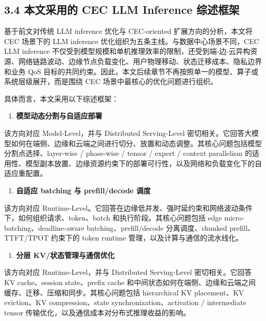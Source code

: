 \documentclass[a4paper,10pt]{ctexart}
\begin{document}
\subsection*{3.4 本文采用的 CEC LLM Inference 综述框架}



基于前文对传统 LLM inference 优化与 CEC-oriented 扩展方向的分析，本文将 CEC 场景下的 LLM inference 优化组织为五条主线。与数据中心场景不同，CEC LLM inference 不仅受到模型规模和单机推理效率的限制，还受到端-边-云异构资源、网络链路波动、边缘节点负载变化、用户物理移动、状态迁移成本、隐私边界和业务 QoS 目标的共同约束。因此，本文后续章节不再按照单一的模型、算子或系统层级展开，而是围绕 CEC 场景中最核心的优化问题进行组织。




具体而言，本文采用以下综述框架：


\begin{enumerate}
\item \textbf{模型动态分割与自适应部署}

\end{enumerate}
该方向对应 Model-Level，并与 Distributed Serving-Level 密切相关。它回答大模型如何在端侧、边缘和云端之间进行切分、放置和动态调整。其核心问题包括模型分割点选择、layer-wise / phase-wise / tensor / expert / context parallelism 的适用性、模型副本放置、边缘资源约束下的部署可行性，以及网络和负载变化下的自适应重配置。


\begin{enumerate}
\item \textbf{自适应 batching 与 prefill/decode 调度}

\end{enumerate}
该方向对应 Runtime-Level。它回答在边缘低并发、强时延约束和网络波动条件下，如何组织请求、token、batch 和执行阶段。其核心问题包括 edge micro-batching、deadline-aware batching、prefill/decode 分离调度、chunked prefill、TTFT/TPOT 约束下的 token runtime 管理，以及计算与通信的流水线化。


\begin{enumerate}
\item \textbf{分层 KV/状态管理与通信优化}

\end{enumerate}
该方向对应 Runtime-Level，并与 Distributed Serving-Level 密切相关。它回答 KV cache、session state、prefix cache 和中间状态如何在端侧、边缘和云端之间缓存、迁移、压缩和同步。其核心问题包括 hierarchical KV placement、KV eviction、KV compression、state synchronization、activation / intermediate tensor 传输优化，以及通信成本对分布式推理收益的影响。
\end{document}
